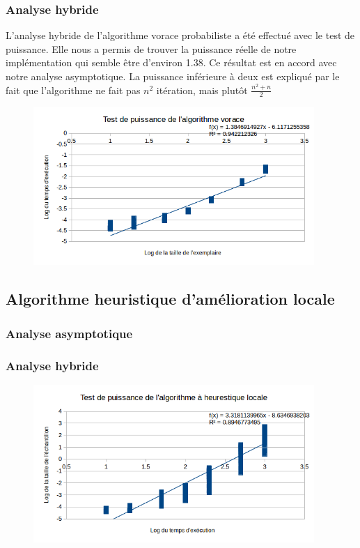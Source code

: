 \documentclass[a4paper, 12pt]{article} %
\begin{document}
\subsubsection*{Analyse hybride}
L'analyse hybride de l'algorithme vorace probabiliste a été effectué avec le test de puissance. Elle nous a permis de trouver
la puissance réelle de notre implémentation qui semble être d'environ 1.38. Ce résultat est en accord avec notre analyse
asymptotique. La puissance inférieure à deux est expliqué par le fait que l'algorithme ne fait pas $n^2$ itération, mais plutôt $\frac{n^2 + n}{2}$
\begin{figure}[H]
    \centering
    \includegraphics[width=0.95\textwidth]{Figure/AlgorithmeVorace}
\end{figure}

\subsection*{Algorithme heuristique d'amélioration locale}
\subsubsection*{Analyse asymptotique}
\subsubsection*{Analyse hybride}
\begin{figure}[H]
    \centering
    \includegraphics[width=0.95\textwidth]{Figure/AlgorithmeLocale}
\end{figure}
\end{document}
